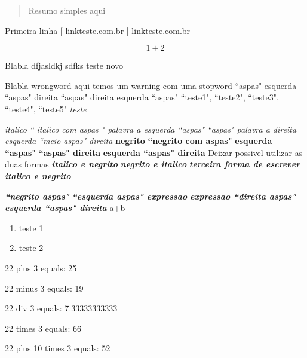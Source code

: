 \documentclass[12pt]{article}
\begin{document}
 
\begin{abstract} 
Resumo simples aqui
\end{abstract}

Primeira linha 
[ linkteste.com.br ] {linkteste.com.br}

\begin{equation} 
1 + 2
\end{equation}

Blabla dfjasldkj sdfks
teste novo

Blabla
wrongword  aqui temos um warning com uma stopword
``aspas"
esquerda ``aspas" direita
``aspas" direita
esquerda ``aspas"
``teste1", ``teste2", ``teste3", ``teste4", ``teste5"\textit{ teste}

\textit{ italico}
\textit{`` italico com aspas "}
\textit{palavra a esquerda ``aspas"}
\textit{``aspas" palavra a direita}
\textit{esquerda ``meio aspas" direita}
\textbf{ negrito }
\textbf{``negrito com aspas"}
\textbf{ esquerda ``aspas"}
\textbf{``aspas" direita}
\textbf{ esquerda ``aspas" direita}
Deixar possivel utilizar as duas formas
\textit{ \textbf{  italico e negrito }}
\textbf{ \textit{ negrito e italico} }
\textbf{\textit{ terceira forma de escrever italico e negrito }}

\textbf{\textit{``negrito aspas"}}
\textbf{\textit{``esquerda aspas" expressao }}
\textbf{\textit{ expressao ``direita aspas"}}
\textbf{\textit{ esquerda ``aspas" direita }}
a+b
\begin{enumerate} 
\item teste 1
\item teste 2
\end{enumerate}

22 plus 3 equals:
25

22 minus 3 equals:
19

22 div 3 equals:
7.33333333333

22 times 3 equals: 
66

22 plus 10 times 3 equals: 
52
\end{document}
